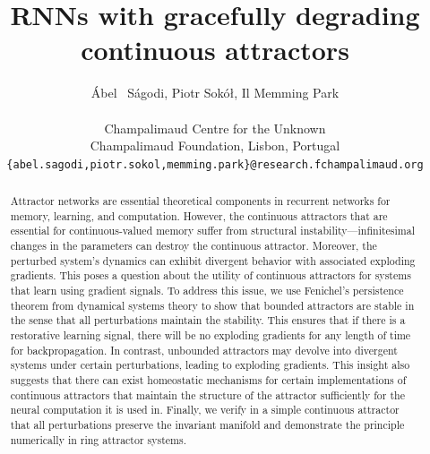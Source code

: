 \documentclass{article} %
\title{RNNs with gracefully degrading continuous attractors}
\author{%
    \'Abel ~S\'agodi, Piotr Sok\'o\l, Il Memming Park \\
    \\
    Champalimaud Centre for the Unknown\\
    Champalimaud Foundation, Lisbon, Portugal\\
    \texttt{\{abel.sagodi,piotr.sokol,memming.park\}@research.fchampalimaud.org} \\
}
\newcounter{ct}
\theoremstyle{definition}
\theoremstyle{remark}
\begin{document}
    


\maketitle

\begin{abstract}
Attractor networks are essential theoretical components in recurrent networks for memory, learning, and computation.
However, the continuous attractors that are essential for continuous-valued memory suffer from structural instability---infinitesimal changes in the parameters can destroy the continuous attractor.
Moreover, the perturbed system's dynamics can exhibit divergent behavior with associated exploding gradients.
This poses a question about the utility of continuous attractors for systems that learn using gradient signals.
To address this issue, we use Fenichel's persistence theorem from dynamical systems theory to show that bounded attractors are stable in the sense that all perturbations maintain the stability.
This ensures that if there is a restorative learning signal, there will be no exploding gradients for any length of time for backpropagation.
In contrast, unbounded attractors may devolve into divergent systems under certain perturbations, leading to exploding gradients.
This insight also suggests that there can exist homeostatic mechanisms for certain implementations of continuous attractors that maintain the structure of the attractor sufficiently for the neural computation it is used in.
Finally, we verify in a simple continuous attractor that all perturbations preserve the invariant manifold and demonstrate the principle numerically in ring attractor systems.
\end{abstract}


\end{document}
